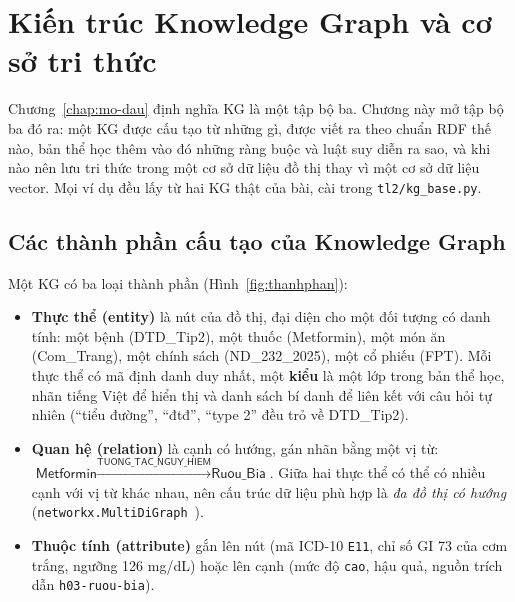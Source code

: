 \chapter{Kiến trúc Knowledge Graph và cơ sở tri thức}\label{chap:kg}

Chương~\ref{chap:mo-dau} định nghĩa KG là một tập bộ ba. Chương này mở tập bộ ba đó ra: một KG được cấu tạo từ
những gì, được viết ra theo chuẩn RDF thế nào, bản thể học thêm vào đó những ràng buộc và luật suy diễn ra sao,
và khi nào nên lưu tri thức trong một cơ sở dữ liệu đồ thị thay vì một cơ sở dữ liệu vector. Mọi ví dụ đều lấy
từ hai KG thật của bài, cài trong \texttt{tl2/kg\_base.py}.

\section{Các thành phần cấu tạo của Knowledge Graph}
Một KG có ba loại thành phần (Hình~\ref{fig:thanhphan}):

\begin{itemize}
  \item \textbf{Thực thể (entity)} là nút của đồ thị, đại diện cho một đối tượng có danh tính: một bệnh
        (\textsf{DTD\_Tip2}), một thuốc (\textsf{Metformin}), một món ăn (\textsf{Com\_Trang}), một chính sách
        (\textsf{ND\_232\_2025}), một cổ phiếu (\textsf{FPT}). Mỗi thực thể có mã định danh duy nhất, một
        \textbf{kiểu} là một lớp trong bản thể học, nhãn tiếng Việt để hiển thị và danh sách bí danh để liên kết
        với câu hỏi tự nhiên (``tiểu đường'', ``đtđ'', ``type 2'' đều trỏ về \textsf{DTD\_Tip2}).
  \item \textbf{Quan hệ (relation)} là cạnh có hướng, gán nhãn bằng một vị từ:
        $\textsf{Metformin} \xrightarrow{\textsf{TUONG\_TAC\_NGUY\_HIEM}} \textsf{Ruou\_Bia}$. Giữa hai thực thể có
        thể có nhiều cạnh với vị từ khác nhau, nên cấu trúc dữ liệu phù hợp là \emph{đa đồ thị có hướng}
        (\texttt{networkx.MultiDiGraph}~\cite{hagberg2008networkx}).
  \item \textbf{Thuộc tính (attribute)} gắn lên nút (mã ICD-10 \texttt{E11}, chỉ số GI 73 của cơm trắng, ngưỡng
        126 mg/dL) hoặc lên cạnh (mức độ \texttt{cao}, hậu quả, nguồn trích dẫn \texttt{h03-ruou-bia}).
\end{itemize}

